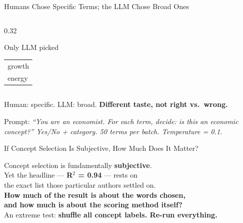 \documentclass[10pt,aspectratio=169]{beamer}
\begin{document}
\begin{frame}{Humans Chose Specific Terms; the LLM Chose Broad Ones}
\begin{columns}[T]
\begin{column}{0.32\textwidth}
\begin{block}{Only LLM picked}
\begin{tabular}{l}
          growth\\
          energy\\
        \end{tabular}
      \end{block}
    \end{column}
  \end{columns}
  \vspace{4pt}
  \begin{center}
    \small Human: specific. \quad LLM: broad. \quad \textbf{Different taste, not right vs.\ wrong.}
  \end{center}
  \vspace{2pt}
  \begin{block}{}
    {\scriptsize\color{gray} Prompt: \textit{``You are an economist. For each term, decide: is this an economic concept?''
    Yes/No + category. 50 terms per batch. Temperature = 0.1.}}
  \end{block}
\end{frame}


\begin{frame}{If Concept Selection Is Subjective, How Much Does It Matter?}
  \vspace{10pt}
  \begin{center}
    \Large Concept selection is fundamentally \textbf{subjective}.\\[14pt]
    Yet the headline --- \textbf{R$^2$ = 0.94} --- rests on\\[4pt]
    the exact list those particular authors settled on.\\[18pt]
    \Large\textbf{How much of the result is about the words chosen,}\\[4pt]
    \textbf{and how much is about the scoring method itself?}\\[18pt]
    \large An extreme test: \textbf{shuffle all concept labels. Re-run everything.}
  \end{center}
\end{frame}
\end{document}

